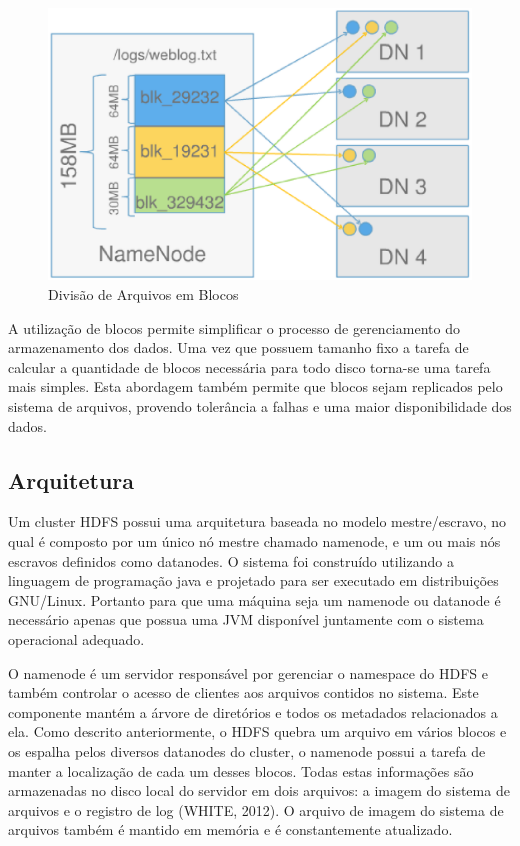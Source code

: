 \begin{figure}[ht!]
	\centering
	\includegraphics[keepaspectratio=true,scale=0.45]
	  {figuras/hdfs-blocos.eps}
	\caption{Divisão de Arquivos em Blocos}
	\label{fig-hdfs-blocos}
\end{figure}

A utilização de blocos permite simplificar o processo de gerenciamento do armazenamento dos dados. Uma vez que possuem tamanho fixo a tarefa de calcular a quantidade de blocos necessária para todo disco torna-se uma tarefa mais simples. Esta abordagem também permite que blocos sejam replicados pelo sistema de arquivos, provendo tolerância a falhas e uma maior disponibilidade dos dados.

\subsection{Arquitetura}

Um cluster HDFS possui uma arquitetura baseada no modelo mestre/escravo, no qual é composto por um único nó mestre chamado namenode, e um ou mais nós escravos definidos como datanodes. O sistema foi construído utilizando a linguagem de programação java e projetado para ser executado em distribuições GNU/Linux. Portanto para que uma máquina seja um namenode ou datanode é necessário apenas que possua uma JVM disponível juntamente com o sistema operacional adequado.

O namenode é um servidor responsável por gerenciar o namespace do HDFS e também controlar o acesso de clientes aos arquivos contidos no sistema. Este componente mantém a árvore de diretórios e todos os metadados relacionados a ela. Como descrito anteriormente, o HDFS quebra um arquivo em vários blocos e os espalha pelos diversos datanodes do cluster, o namenode possui a tarefa de manter a localização de cada um desses blocos. Todas estas informações são armazenadas no disco local do servidor em dois arquivos: a imagem do sistema de arquivos e o registro de log (WHITE, 2012). O arquivo de imagem do sistema de arquivos também é mantido em memória e é constantemente atualizado.

